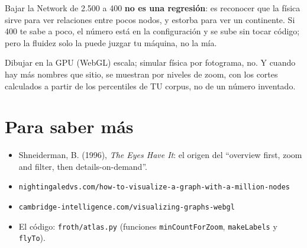 \documentclass[11pt,a4paper]{article}
\begin{document}
Bajar la Network de 2.500 a 400 \textbf{no es una regresión}: es reconocer que la física
sirve para ver relaciones entre pocos nodos, y estorba para ver un continente. Si 400 te
sabe a poco, el número está en la configuración y se sube sin tocar código; pero la
fluidez solo la puede juzgar tu máquina, no la mía.

\begin{resumen}
Dibujar en la GPU (WebGL) escala; simular física por fotograma, no. Y cuando hay más
nombres que sitio, se muestran por niveles de zoom, con los cortes calculados a partir de
los percentiles de TU corpus, no de un número inventado.
\end{resumen}

\section{Para saber más}

\begin{itemize}
  \item Shneiderman, B. (1996), \emph{The Eyes Have It}: el origen del ``overview first,
        zoom and filter, then details-on-demand''.
  \item \texttt{nightingaledvs.com/how-to-visualize-a-graph-with-a-million-nodes}
  \item \texttt{cambridge-intelligence.com/visualizing-graphs-webgl}
  \item El código: \texttt{froth/atlas.py} (funciones \texttt{minCountForZoom},
        \texttt{makeLabels} y \texttt{flyTo}).
\end{itemize}
\end{document}
